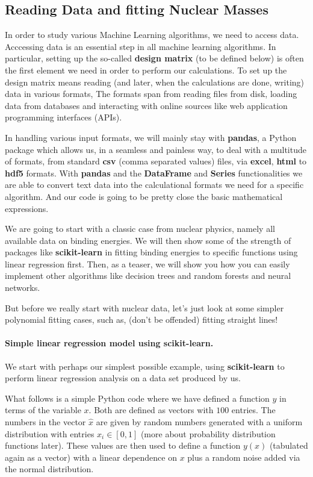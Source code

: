 \documentclass[%
oneside,                 %
final,                   %
10pt]{article}
\begin{document}
\subsection*{Reading Data and fitting Nuclear Masses}

In order to study various Machine Learning algorithms, we need to
access data. Acccessing data is an essential step in all machine
learning algorithms. In particular, setting up the so-called \textbf{design
matrix} (to be defined below) is often the first element we need in
order to perform our calculations. To set up the design matrix means
reading (and later, when the calculations are done, writing) data
in various formats, The formats span from reading files from disk,
loading data from databases and interacting with online sources
like web application programming interfaces (APIs).

In handling various input formats, we will mainly stay with \textbf{pandas},
a Python package which allows us, in a seamless and painless way, to
deal with a multitude of formats, from standard \textbf{csv} (comma separated
values) files, via \textbf{excel}, \textbf{html} to \textbf{hdf5} formats.  With \textbf{pandas}
and the \textbf{DataFrame}  and \textbf{Series} functionalities we are able to convert text data
into the calculational formats we need for a specific algorithm. And our code is going to be 
pretty close the basic mathematical expressions.

We are going to start with a classic case from nuclear physics, namely all
available data on binding energies. We will then show some of the
strength of packages like \textbf{scikit-learn} in fitting binding energies to
specific functions using linear regression first. Then, as a teaser, we will show you how 
you can easily implement other algorithms like decision trees and random forests and neural networks.

But before we really start with nuclear data, let's just look at some simpler polynomial fitting cases, such as,
(don't be offended) fitting straight lines!


\paragraph{Simple linear regression model using \textbf{scikit-learn}.}
We start with perhaps our simplest possible example, using \textbf{scikit-learn} to perform linear regression analysis on a data set produced by us. 

What follows is a simple Python code where we have defined a function
$y$ in terms of the variable $x$. Both are defined as vectors with  $100$ entries. 
The numbers in the vector $\hat{x}$ are given
by random numbers generated with a uniform distribution with entries
$x_i \in [0,1]$ (more about probability distribution functions
later). These values are then used to define a function $y(x)$
(tabulated again as a vector) with a linear dependence on $x$ plus a
random noise added via the normal distribution.
\end{document}
